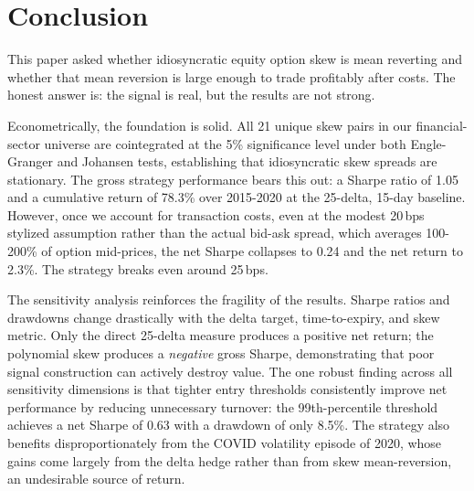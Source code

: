 \documentclass[12pt, a4paper]{article}
\begin{document}
\section{Conclusion}
\label{sec:conclusion}

This paper asked whether idiosyncratic equity option skew is mean reverting and whether that mean reversion is large enough to trade profitably after costs. The honest answer is: the signal is real, but the results are not strong.

Econometrically, the foundation is solid. All 21 unique skew pairs in our financial-sector universe are cointegrated at the 5\% significance level under both Engle-Granger and Johansen tests, establishing that idiosyncratic skew spreads are stationary. The gross strategy performance bears this out: a Sharpe ratio of 1.05 and a cumulative return of 78.3\% over 2015-2020 at the 25-delta, 15-day baseline. However, once we account for transaction costs, even at the modest 20\,bps stylized assumption rather than the actual bid-ask spread, which averages 100-200\% of option mid-prices, the net Sharpe collapses to 0.24 and the net return to 2.3\%. The strategy breaks even around 25\,bps.

The sensitivity analysis reinforces the fragility of the results. Sharpe ratios and drawdowns change drastically with the delta target, time-to-expiry, and skew metric. Only the direct 25-delta measure produces a positive net return; the polynomial skew produces a \emph{negative} gross Sharpe, demonstrating that poor signal construction can actively destroy value. The one robust finding across all sensitivity dimensions is that tighter entry thresholds consistently improve net performance by reducing unnecessary turnover: the 99th-percentile threshold achieves a net Sharpe of 0.63 with a drawdown of only 8.5\%. The strategy also benefits disproportionately from the COVID volatility episode of 2020, whose gains come largely from the delta hedge rather than from skew mean-reversion, an undesirable source of return.
\end{document}
